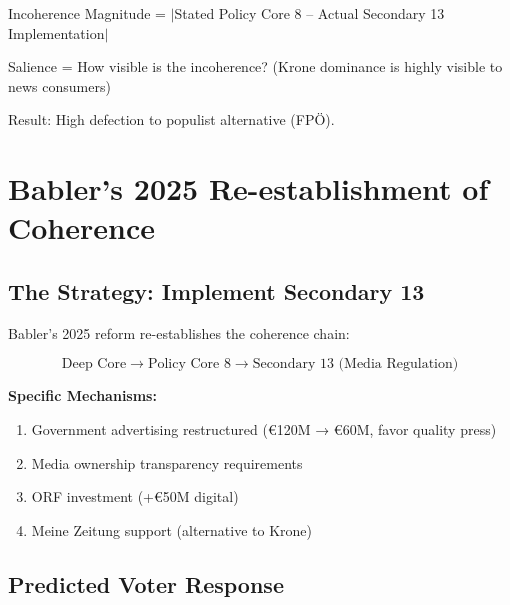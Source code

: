Incoherence Magnitude = $|$Stated Policy Core 8 – Actual Secondary 13 Implementation$|$

Salience = How visible is the incoherence? (Krone dominance is highly visible to news consumers)

Result: High defection to populist alternative (FPÖ).


\section{Babler's 2025 Re-establishment of Coherence}
\label{sec:cj-babler-repair}

\subsection{The Strategy: Implement Secondary 13}

Babler's 2025 reform re-establishes the coherence chain:

\begin{equation}
\text{Deep Core} \rightarrow \text{Policy Core 8} \rightarrow \text{Secondary 13 (Media Regulation)}
\end{equation}

\textbf{Specific Mechanisms:}

\begin{enumerate}
\item Government advertising restructured (€120M → €60M, favor quality press)
\item Media ownership transparency requirements
\item ORF investment (+€50M digital)
\item Meine Zeitung support (alternative to Krone)
\end{enumerate}

\subsection{Predicted Voter Response}

